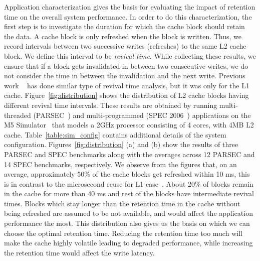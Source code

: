 Application characterization gives the basis for evaluating the impact of retention time on the overall system performance. In order to do this characterization, the first step is to investigate the duration for which the cache block should retain the data.  A cache block is only refreshed when the block is written. Thus, we record intervals between two successive writes (refreshes) to the same L2 cache block. We define this interval to be {\it revival time}.
While collecting these results, we ensure that if a block gets invalidated in between two consecutive writes,
we do not consider the time in between the invalidation and the next write.
Previous work ~\cite{brooks} has done similar type of revival time analysis, but it was only for the L1 cache. Figure~\ref{fig:distribution} shows the distribution of L2 cache blocks having different revival time intervals. These results are obtained by running multi-threaded (PARSEC~\cite{PARSEC}) and multi-programmed (SPEC 2006~\cite{SPEC}) applications on the M5 Simulator~\cite{M5} that models a 2GHz processor consisting of 4 cores, with 4MB L2 cache. Table~\ref{table:sim_config} contains additional details of the system configuration.
Figures~\ref{fig:distribution} (a) and (b) show the results of three PARSEC and SPEC benchmarks along with the averages
across 12 PARSEC  and 14 SPEC benchmarks, respectively. We observe from the figures that, on an average,
approximately 50\% of the cache blocks get refreshed within 10 ms, this is in contrast to the microsecond
reuse for L1 case~\cite{brooks}. About 20\% of blocks remain in the cache for more than 40 ms and rest of the blocks
have intermediate revival times. Blocks which stay longer than the retention time in the cache without being refreshed
are assumed to be not available, and would affect the application performance the most.
This distribution also gives us the basis on which we can choose the optimal retention time.
Reducing the retention time too much will make the cache highly volatile leading to degraded performance,
while increasing the retention time would affect the write latency.



